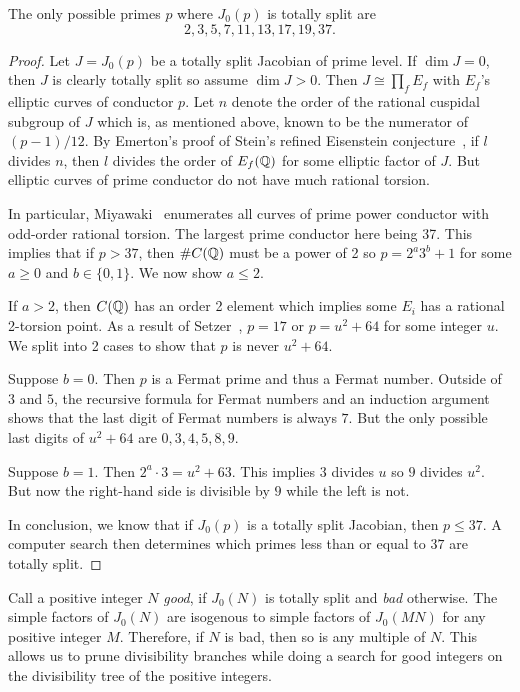\documentclass[11pt, proquest]{uwthesis}
\begin{document}
\begin{lemma}
    \label{lem:good_primes}
    The only possible primes $p$ where $J_0(p)$ is totally split are
    \[
        2, 3, 5, 7, 11, 13, 17, 19, 37.
    \]
\end{lemma}
\begin{proof}
    Let $J=J_0(p)$ be a totally split Jacobian of prime level. If $\dim J=0$,
    then $J$ is clearly totally split so assume $\dim J>0$. Then $J\cong
    \prod_f E_f$ with $E_f$'s elliptic curves of conductor $p$. Let $n$ denote
    the order of the rational cuspidal subgroup of $J$ which is, as mentioned
    above, known to be the numerator of $(p-1)/12$. By Emerton's proof of
    Stein's refined Eisenstein conjecture~\cite[Theorem B]{emerton:optimal}, if
    $l$ divides $n$, then $l$ divides the order of $E_f(\mathbb{Q})$ for some elliptic
    factor of $J$. But elliptic curves of prime conductor do not have much
    rational torsion.

    In particular, Miyawaki~\cite{miyawaki:ell_prime} enumerates all curves of prime
    power conductor with odd-order rational torsion. The largest prime
    conductor here being 37. This implies that if $p>37$, then $\#C(\mathbb{Q})$ must
    be a power of 2 so $p=2^a 3^b + 1$ for some $a\geq 0$ and $b\in \{0,1\}$.
    We now show $a\leq 2$.

    If $a>2$, then $C(\mathbb{Q})$ has an order 2 element which implies some $E_i$ has
    a rational 2-torsion point. As a result of Setzer~\cite[Theorem
    2]{setzer:ell_prime}, $p=17$ or $p=u^2+64$ for some integer $u$. We split into 2
    cases to show that $p$ is never $u^2+64$.

    Suppose $b=0$. Then $p$ is a Fermat prime and thus a Fermat number. Outside
    of $3$ and $5$, the recursive formula for Fermat numbers and an induction
    argument shows that the last digit of Fermat numbers is always $7$. But the
    only possible last digits of $u^2+64$ are $0, 3, 4, 5, 8, 9$.

    Suppose $b=1$. Then $2^a\cdot 3 = u^2+63$. This implies $3$ divides $u$ so
    $9$ divides $u^2$. But now the right-hand side is divisible by $9$ while the
    left is not.

    In conclusion, we know that if $J_0(p)$ is a totally split Jacobian, then $p\leq
    37$. A computer search then determines which primes less than or equal to
    $37$ are totally split.
\end{proof}

Call a positive integer $N$ \emph{good}, if $J_0(N)$ is totally split and
\emph{bad} otherwise. The simple factors of $J_0(N)$ are isogenous to simple
factors of $J_0(MN)$ for any positive integer $M$. Therefore, if $N$ is bad,
then so is any multiple of $N$. This allows us to prune divisibility branches
while doing a search for good integers on the divisibility tree of the positive
integers.
\end{document}
